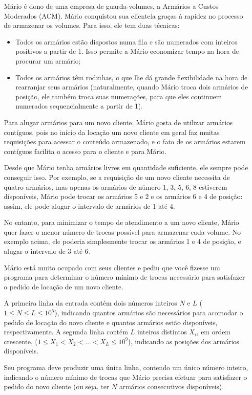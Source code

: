 
%
%
%
%

Mário é dono de uma empresa de guarda-volumes, a Armários a Custos Moderados (ACM). Mário conquistou sua clientela graças à rapidez no processo de armazenar os volumes. Para isso, ele tem duas técnicas:
\begin{itemize}
	\item Todos os armários estão dispostos numa fila e são numerados com inteiros positivos a partir de 1. Isso permite a Mário economizar tempo na hora de procurar um armário;
	\item Todos os armários têm rodinhas, o que lhe dá grande flexibilidade na hora de rearranjar seus armários (naturalmente, quando Mário troca dois armários de posição, ele também troca suas numerações, para que eles continuem numerados sequencialmente a partir de 1).
\end{itemize}

Para alugar armários para um novo cliente, Mário gosta de utilizar armários contíguos, pois no início da locação um novo cliente em geral faz muitas requisições para acessar o conteúdo armazenado,
e o fato de os armários estarem contíguos facilita o acesso para o cliente e para Mário.

Desde que Mário tenha armários livres em quantidade suficiente, ele sempre pode conseguir isso. Por exemplo, se a requisição de um novo cliente necessita de quatro armários, mas apenas os armários de número 1, 3, 5, 6, 8 estiverem disponíveis, Mário pode trocar os armários 5 e 2 e os armários 6 e 4 de posição: assim, ele pode alugar o intervalo de armários de 1 até 4.

No entanto, para minimizar o tempo de atendimento a um novo cliente, Mário quer fazer o menor número de trocas possível para armazenar cada volume. No exemplo acima, ele poderia simplesmente trocar os armários 1 e 4 de posição, e alugar o intervalo de 3 até 6.

Mário está muito ocupado com seus clientes e pediu que você fizesse um programa para determinar o número mínimo de trocas necessário para satisfazer o pedido de locação de um novo cliente.

\Entrada%
A primeira linha da entrada contém dois números inteiros $N$ e $L$ \mbox{($1 \leq N \leq L \leq 10^5$)}, indicando quantos armários são necessários para acomodar o pedido de locação do novo cliente e quantos armários estão
disponíveis, respectivamente. A segunda linha contém $L$ inteiros distintos $X_i $, em ordem crescente, ($1 \leq X_1 < X_2 < \dots < X_L \leq 10^9$), indicando as posições dos armários disponíveis.

\Saida%
Seu programa deve produzir uma única linha, contendo um único número inteiro, indicando o número mínimo de trocas que Mário precisa efetuar para satisfazer o pedido do novo cliente (ou seja, ter $N$ armários consecutivos disponíveis).

%
